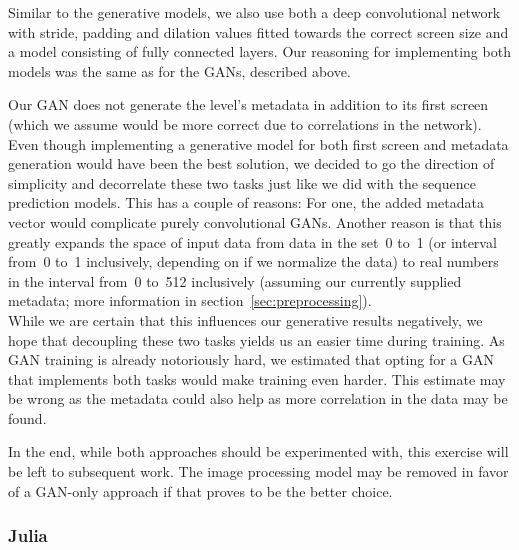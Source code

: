 Similar to the generative models, we also use both a deep
convolutional network with stride, padding and dilation values fitted
towards the correct screen size and a model consisting of fully
connected layers. Our reasoning for implementing both models was the
same as for the GANs, described above.

Our GAN does not generate the level's metadata in addition to its
first screen (which we assume would be more correct due to
correlations in the network). Even though implementing a generative
model for both first screen and metadata generation would have been
the best solution, we decided to go the direction of simplicity and
decorrelate these two tasks just like we did with the sequence
prediction models. This has a couple of reasons: For one, the added
metadata vector would complicate purely convolutional GANs. Another
reason is that this greatly expands the space of input data from data
in the set~0 to~1 (or interval from~0 to~1 inclusively, depending on
if we normalize the data) to real numbers in the interval from~0
to~512 inclusively (assuming our currently supplied metadata; more
information in section~\ref{sec:preprocessing}). \\
While we are certain that this influences our generative results
negatively, we hope that decoupling these two tasks yields us an
easier time during training. As GAN training is already notoriously
hard, we estimated that opting for a GAN that implements both tasks
would make training even harder. This estimate may be wrong as the
metadata could also help as more correlation in the data may be found.

In the end, while both approaches should be experimented with, this
exercise will be left to subsequent work. The image processing model
may be removed in favor of a GAN-only approach if that proves to be
the better choice.

\subsubsection{Julia}
\label{sec:julia}

